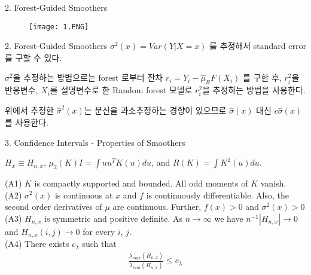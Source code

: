 \documentclass[mathserif]{beamer}
\begin{document}
\begin{frame}{2. Forest-Guided Smoothers}
    \begin{figure}
        \centering
        \texttt{[image: 1.PNG]}
    \end{figure}
\end{frame}

\begin{frame}{2. Forest-Guided Smoothers }
$\sigma^2(x) = Var(Y|X=x)$ 를 추정해서 standard error를 구할 수 있다.\\

\vspace{2mm}

$\sigma^2$을 추정하는 방법으로는 forest 로부터 잔차 $r_i = Y_i-\hat{\mu}_RF(X_i)$ 를 구한 후,  $r_i^2$을 반응변수, $X_i$를 설명변수로 한 Random forest 모델로 $r_i^2$을 추정하는 방법을 사용한다.

\vspace{1mm}
위에서 추정한 $\hat{\sigma}^2(x)$는 분산을 과소추정하는 경향이 있으므로 $\hat{\sigma}(x)$ 대신 $c\hat{\sigma}(x)$ 를 사용한다.

\end{frame}

\begin{frame}{3. Confidence Intervals - Properties of Smoothers}

$H_x \equiv H_{n,x}$, $\mu_2(K)I = \int uu^TK(u)du$, and  $R(K) = \int K^2(u)du.$

\vspace{2mm}

\begin{tcolorbox}[
  colback=Magenta!5!white,
  colframe=Magenta!75!black,
  title={Assumptions}]
(A1) $K$ is compactly supported and bounded. All odd moments of $K$ vanish.\\
(A2) $\sigma^2(x)$ is continuous at $x$ and $f$ is continuously differentiable. Also, the second
order derivatives of $\mu$ are continuous. Further, $f(x)>0$ and $\sigma^2(x)>0$\\
(A3) $H_{n,x}$ is symmetric and positive definite. As $n \rightarrow \infty$ we have $n^{-1}|H_{n,x}|\rightarrow 0$ and $H_{n,x}(i,j)\rightarrow 0$ for every $i$, $j$.\\
(A4) There exists $c_\lambda$ such that 
\begin{align*}
    \frac{\lambda_{max}(H_{n,x})}{\lambda_{min}(H_{n,x})} \leq c_\lambda
\end{align*}
\end{tcolorbox}

\end{frame}
\end{document}
